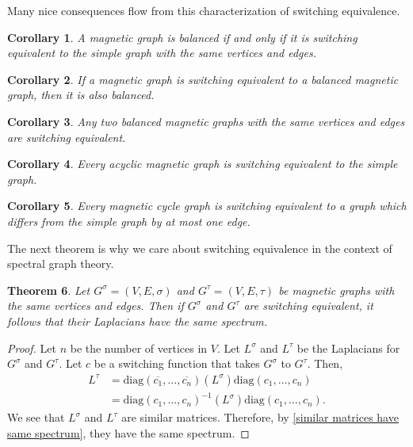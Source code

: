 \documentclass[12pt]{article}
\newtheorem{thm}{Theorem}
\newtheorem{corollary}[thm]{Corollary}
\theoremstyle{definition}
\begin{document}
Many nice consequences flow from this characterization of switching equivalence. 

\begin{corollary}\label{balanced iff switching equivalent to simple graph}
A magnetic graph is balanced if and only if it is switching equivalent to the simple graph with the same vertices and edges.
\end{corollary}

\begin{corollary}
If a magnetic graph is switching equivalent to a balanced magnetic graph, then it is also balanced.  
\end{corollary}

\begin{corollary}
Any two balanced magnetic graphs with the same vertices and edges are switching equivalent. 
\end{corollary}

\begin{corollary}
Every acyclic magnetic graph is switching equivalent to the simple graph.
\end{corollary}

\begin{corollary}
Every magnetic cycle graph is switching equivalent to a graph which differs from the simple graph by at most one edge. 
\end{corollary}

The next theorem is why we care about switching equivalence in the context of spectral graph theory.

\begin{thm}\label{switching preserves spectrum}
Let $G^\sigma = (V, E, \sigma)$ and $G^\tau = (V, E, \tau)$ be magnetic graphs with the same vertices and edges. Then if $G^\sigma$ and $G^\tau$ are switching equivalent, it follows that their Laplacians have the same spectrum.
\end{thm}
\begin{proof}
Let $n$ be the number of vertices in $V$. Let $L^\sigma$ and $L^\tau$ be the Laplacians for $G^\sigma$ and $G^\tau$. Let $c$ be a switching function that takes $G^\sigma$ to $G^\tau$. Then, 
\begin{align*}
L^\tau &= \text{diag}(\overline{c_1}, \dots, \overline{c_n})\left(L^\sigma\right) \text{diag}(c_1, \dots, c_n) \\
&= \text{diag}(c_1, \dots, c_n)^{-1} \left(L^\sigma\right) \text{diag}(c_1, \dots, c_n).
\end{align*}
We see that $L^\sigma$ and $L^\tau$ are similar matrices. Therefore, by \cref{similar matrices have same spectrum}, they have the same spectrum.
\end{proof}
\end{document}
